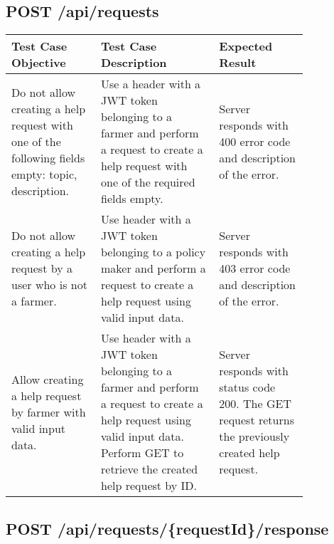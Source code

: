 \subsection{POST \slash api\slash requests}
\begin{longtable}{p{0.25\linewidth}p{0.33\linewidth}p{0.25\linewidth}}
	\toprule
	\textbf{Test Case Objective} & \textbf{Test Case Description} & \textbf{Expected Result}\\
	\midrule
	Do not allow creating a help request with one of the following fields empty: topic, description. & Use a header with a JWT token belonging to a farmer and perform a request to create a help request with one of the required fields empty. & Server responds with 400 error code and description of the error.\\
	\midrule
	Do not allow creating a help request by a user who is not a farmer. & Use header with a JWT token belonging to a policy maker and perform a request to create a help request using valid input data. & Server responds with 403 error code and description of the error.\\
	\midrule
	Allow creating a help request by farmer with valid input data. & Use header with a JWT token belonging to a farmer and perform a request to create a help request using valid input data. Perform GET to retrieve the created help request by ID. & Server responds with status code 200. The GET request returns the previously created help request.\\
	\bottomrule
\end{longtable}

\subsection{POST \slash api\slash requests\slash \{requestId\}\slash response}

